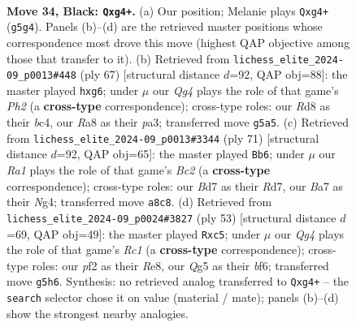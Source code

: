 \documentclass[11pt]{article}
\begin{document}
\clearpage

\begin{figure}[p]\centering
\begin{subfigure}{0.46\textwidth}\centering
\resizebox{\linewidth}{!}{%
\newchessgame
\chessboard[
  setfen={r2r3k/bp1b1Qp1/p3p2P/6q1/6B1/BP1p4/P4PKP/1R2R3 b - - 2 34},
  showmover=false,
  pgfstyle=straightmove, color=movearrow, markmove={g5-g4}
]}
\caption{}
\end{subfigure}\hfill
\begin{subfigure}{0.46\textwidth}\centering
\resizebox{\linewidth}{!}{%
\newchessgame
\chessboard[
  setfen={4r1k1/5p1p/6P1/6b1/2Bp2Q1/P2P4/3qrPK1/R4R2 b - - 0 34},
  showmover=false,
  pgfstyle=straightmove, color=movearrow, markmove={h7-g6}
]}
\caption{}
\end{subfigure}
\\[4pt]
\begin{subfigure}{0.46\textwidth}\centering
\resizebox{\linewidth}{!}{%
\newchessgame
\chessboard[
  setfen={1r4k1/2br2p1/8/3q1p1p/Q5n1/Pp4P1/1B1N1P1P/3RR1K1 b - - 2 36},
  showmover=false,
  pgfstyle=straightmove, color=movearrow, markmove={c7-b6}
]}
\caption{}
\end{subfigure}\hfill
\begin{subfigure}{0.46\textwidth}\centering
\resizebox{\linewidth}{!}{%
\newchessgame
\chessboard[
  setfen={1kr1r3/4bp2/p2p1Bp1/q1P1p2p/8/P2Q1P2/K5PP/2RR4 b - - 0 27},
  showmover=false,
  pgfstyle=straightmove, color=movearrow, markmove={c8-c5}
]}
\caption{}
\end{subfigure}
\caption{\textbf{Move 34, Black: \texttt{Qxg4+}.} (a) Our position; Melanie plays \texttt{Qxg4+} (\texttt{g5g4}). Panels (b)--(d) are the retrieved master positions whose correspondence most drove this move (highest QAP objective among those that transfer to it). (b) Retrieved from \texttt{lichess\_elite\_2024-09\_p0013\#448} (ply 67) [structural distance $d$=92, QAP obj=88]: the master played \texttt{hxg6}; under $\mu$ our \emph{Qg4} plays the role of that game's \emph{Ph2} (a \textbf{cross-type} correspondence); cross-type roles: our \emph{R}d8 as their \emph{b}c4, our \emph{R}a8 as their \emph{p}a3; transferred move \texttt{g5a5}. (c) Retrieved from \texttt{lichess\_elite\_2024-09\_p0013\#3344} (ply 71) [structural distance $d$=92, QAP obj=65]: the master played \texttt{Bb6}; under $\mu$ our \emph{Ra1} plays the role of that game's \emph{Bc2} (a \textbf{cross-type} correspondence); cross-type roles: our \emph{B}d7 as their \emph{R}d7, our \emph{B}a7 as their \emph{N}g4; transferred move \texttt{a8c8}. (d) Retrieved from \texttt{lichess\_elite\_2024-09\_p0024\#3827} (ply 53) [structural distance $d$=69, QAP obj=49]: the master played \texttt{Rxc5}; under $\mu$ our \emph{Qg4} plays the role of that game's \emph{Rc1} (a \textbf{cross-type} correspondence); cross-type roles: our \emph{p}f2 as their \emph{R}e8, our \emph{Q}g5 as their \emph{b}f6; transferred move \texttt{g5h6}. Synthesis: no retrieved analog transferred to \texttt{Qxg4+} -- the \texttt{search} selector chose it on value (material / mate); panels (b)--(d) show the strongest nearby analogies.}
\label{fig:thought-m67}
\end{figure}
\end{document}
